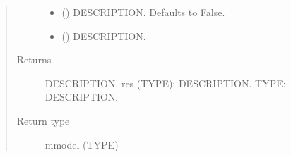 \documentclass[letterpaper,10pt,english]{sphinxmanual}
\begin{document}
\begin{fulllineitems}
\begin{fulllineitems}
\begin{quote}
\begin{description}
\begin{itemize}
\item {} 
\sphinxAtStartPar
{} (\sphinxstyleliteralemphasis{\sphinxupquote{, }}) \textendash{} DESCRIPTION. Defaults to False.

\item {} 
\sphinxAtStartPar
{} () \textendash{} DESCRIPTION.

\end{itemize}

\item[{Returns}] \leavevmode
\sphinxAtStartPar
DESCRIPTION.
res (TYPE): DESCRIPTION.
TYPE: DESCRIPTION.

\item[{Return type}] \leavevmode
\sphinxAtStartPar
mmodel (TYPE)

\end{description}\end{quote}

\end{fulllineitems}


\end{fulllineitems}

\end{document}
